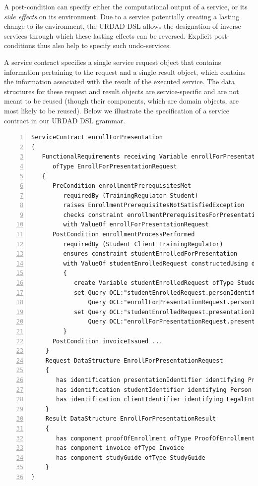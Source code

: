 A post-condition can specify either the computational output of a service, or its \emph{side effects} on its environment. Due to a service potentially creating a lasting change to its environment, the URDAD-DSL allows the designation of inverse services through which these lasting effects can be reversed. Explicit post-conditions thus also help to specify such undo-services.

A service contract specifies a single service request object that contains information pertaining to the request and a single result object, which contains the information associated with the result of the executed service. The data structures for these request and result objects are service-specific and are not meant to be reused (though their components, which are domain objects, are most likely to be reused). Below we illustrate the specification of a service contract in our URDAD DSL grammar.
\lstset{language=urdad,caption=Specifying a service contract in the textual URDAD DSL syntax.,label=contractTextSyntax}
\small \begin{lstlisting}[numbers=left,escapechar=|]
ServiceContract enrollForPresentation
{
   FunctionalRequirements receiving Variable enrollForPresentationRequest 
      ofType EnrollForPresentationRequest
   {
      PreCondition enrollmentPrerequisitesMet
         requiredBy (TrainingRegulator Student) 
         raises EnrollmentPrerequisitesNotSatisfiedException
         checks constraint enrollmentPrerequisitesForPresentationMet
         with ValueOf enrollForPresentationRequest
      PostCondition enrollmentProcessPerformed
         requiredBy (Student Client TrainingRegulator)
         ensures constraint studentEnrolledForPresentation 
         with ValueOf studentEnrolledRequest constructedUsing doSequential
         {
            create Variable studentEnrolledRequest ofType StudentEnrolledRequest
            set Query OCL:"studentEnrolledRequest.personIdentifier" equalTo
                Query OCL:"enrollForPresentationRequest.personIdentifier"                            
            set Query OCL:"studentEnrolledRequest.presentationIdentifier" equalTo
                Query OCL:"enrollForPresentationRequest.presentationIdentifier"                            
         }  
      PostCondition invoiceIssued ...
    }            
    Request DataStructure EnrollForPresentationRequest 
    {
       has identification presentationIdentifier identifying Presentation
       has identification studentIdentifier identifying Person
       has identification clientIdentifier identifying LegalEntity         
    }
    Result DataStructure EnrollForPresentationResult 
    {
       has component proofOfEnrollment ofType ProofOfEnrollment
       has component invoice ofType Invoice
       has component studyGuide ofType StudyGuide
    }
}
\end{lstlisting}\normalsize

